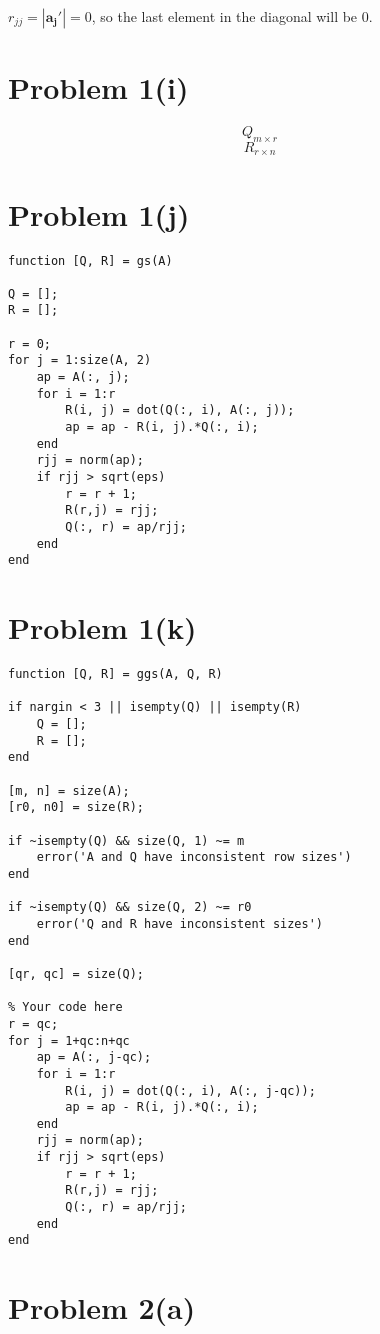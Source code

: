 \documentclass{article}
\begin{document}
$r_{jj} = |\mathbf{a_j'}| = 0$, so the last element in the diagonal will be 0.

\section*{Problem 1(i)}

$$Q_{m \times r}$$
$$R_{r \times n}$$

\section*{Problem 1(j)}

\begin{verbatim}
function [Q, R] = gs(A)

Q = [];
R = [];

r = 0;
for j = 1:size(A, 2)
    ap = A(:, j);
    for i = 1:r
        R(i, j) = dot(Q(:, i), A(:, j));
        ap = ap - R(i, j).*Q(:, i);
    end
    rjj = norm(ap);
    if rjj > sqrt(eps)
        r = r + 1;
        R(r,j) = rjj;
        Q(:, r) = ap/rjj;
    end
end
\end{verbatim}

\section*{Problem 1(k)}

\begin{verbatim}
function [Q, R] = ggs(A, Q, R)

if nargin < 3 || isempty(Q) || isempty(R)
    Q = [];
    R = [];
end

[m, n] = size(A);
[r0, n0] = size(R);

if ~isempty(Q) && size(Q, 1) ~= m
    error('A and Q have inconsistent row sizes')
end

if ~isempty(Q) && size(Q, 2) ~= r0
    error('Q and R have inconsistent sizes')
end

[qr, qc] = size(Q);

% Your code here
r = qc;
for j = 1+qc:n+qc
    ap = A(:, j-qc);
    for i = 1:r
        R(i, j) = dot(Q(:, i), A(:, j-qc));
        ap = ap - R(i, j).*Q(:, i);
    end
    rjj = norm(ap);
    if rjj > sqrt(eps)
        r = r + 1;
        R(r,j) = rjj;
        Q(:, r) = ap/rjj;
    end
end
\end{verbatim}

\section*{Problem 2(a)}
\end{document}
